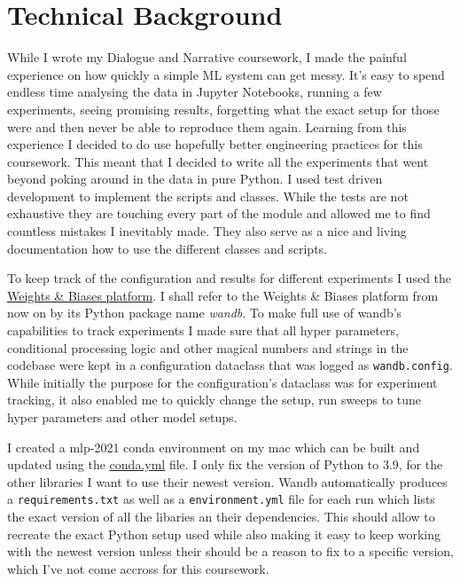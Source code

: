 \documentclass{article}
\begin{document}
    \section{Technical Background}\label{sec:technical-background}

    While I wrote my Dialogue and Narrative coursework, I made the painful experience on how quickly a
    simple ML system can get messy. It's
    easy to spend endless time analysing the data in Jupyter Notebooks, running a few experiments, seeing promising results,
    forgetting what the exact setup for those were and then never be able to reproduce them again. Learning from this
    experience I decided to do use hopefully better engineering practices for this coursework. This meant
    that I decided to write all the experiments that went beyond poking around in the data in pure Python. I used test
    driven development to implement the scripts and classes. While the tests are not exhaustive they are touching every
    part of the module and allowed me to find countless mistakes I inevitably made. They also serve as a nice and living
    documentation how to use the different classes and scripts.

    To keep track of the configuration and results for different experiments I used the
    \href{https://wandb.ai/site}{Weights \& Biases platform}\cite{wandb}.
    I shall refer to the Weights \& Biases platform from now on by its Python package name \textit{wandb}. To make full
    use of wandb's capabilities to track experiments I made sure that all hyper parameters,
    conditional processing logic and other magical numbers and strings in the codebase were kept in a configuration
    dataclass that was logged as \texttt{wandb.config}. While initially the purpose for the configuration's dataclass was for experiment
    tracking, it also enabled me to quickly change the setup, run sweeps to tune hyper parameters and other model setups.

    I created a mlp-2021 conda environment on my mac \cite{conda-forge} which can be built and updated using the
    \href{https://github.com/isabelladegen/mlp-2021/blob/main/conda.yml}{conda.yml} file. I only fix the version of Python to 3.9,
    for the other libraries I want to use their newest version. Wandb automatically produces a \texttt{requirements.txt}
    as well as a \texttt{environment.yml} file for each run which lists the exact version of all the libaries an their
    dependencies. This should allow to recreate the exact Python setup used while also making it easy to keep working with
    the newest version unless their should be a reason to fix to a specific version, which I've not come accross for this coursework.
\end{document}
